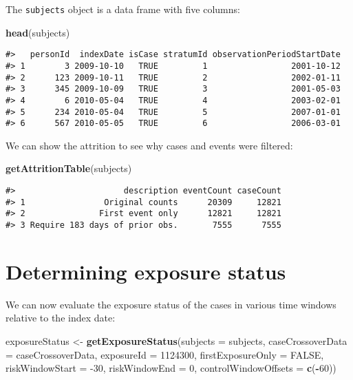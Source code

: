 \documentclass[]{article}
\newenvironment{Shaded}{\begin{snugshade}}{\end{snugshade}}
\newcommand{\DataTypeTok}[1]{\textcolor[rgb]{0.13,0.29,0.53}{#1}}
\newcommand{\DecValTok}[1]{\textcolor[rgb]{0.00,0.00,0.81}{#1}}
\newcommand{\KeywordTok}[1]{\textcolor[rgb]{0.13,0.29,0.53}{\textbf{#1}}}
\newcommand{\NormalTok}[1]{#1}
\newcommand{\OperatorTok}[1]{\textcolor[rgb]{0.81,0.36,0.00}{\textbf{#1}}}
\newcommand{\OtherTok}[1]{\textcolor[rgb]{0.56,0.35,0.01}{#1}}
\newcommand{\StringTok}[1]{\textcolor[rgb]{0.31,0.60,0.02}{#1}}
\begin{document}
The \texttt{subjects} object is a data frame with five columns:

\begin{Shaded}
\begin{Highlighting}[]
\KeywordTok{head}\NormalTok{(subjects)}
\end{Highlighting}
\end{Shaded}

\begin{verbatim}
#>   personId  indexDate isCase stratumId observationPeriodStartDate
#> 1        3 2009-10-10   TRUE         1                 2001-10-12
#> 2      123 2009-10-11   TRUE         2                 2002-01-11
#> 3      345 2009-10-09   TRUE         3                 2001-05-03
#> 4        6 2010-05-04   TRUE         4                 2003-02-01
#> 5      234 2010-05-04   TRUE         5                 2007-01-01
#> 6      567 2010-05-05   TRUE         6                 2006-03-01
\end{verbatim}

We can show the attrition to see why cases and events were filtered:

\begin{Shaded}
\begin{Highlighting}[]
\KeywordTok{getAttritionTable}\NormalTok{(subjects)}
\end{Highlighting}
\end{Shaded}

\begin{verbatim}
#>                      description eventCount caseCount
#> 1                Original counts      20309     12821
#> 2               First event only      12821     12821
#> 3 Require 183 days of prior obs.       7555      7555
\end{verbatim}

\hypertarget{determining-exposure-status}{%
\section{Determining exposure
status}\label{determining-exposure-status}}

We can now evaluate the exposure status of the cases in various time
windows relative to the index date:

\begin{Shaded}
\begin{Highlighting}[]
\NormalTok{exposureStatus <-}\StringTok{ }\KeywordTok{getExposureStatus}\NormalTok{(}\DataTypeTok{subjects =}\NormalTok{ subjects,}
                                    \DataTypeTok{caseCrossoverData =}\NormalTok{ caseCrossoverData,}
                                    \DataTypeTok{exposureId =} \DecValTok{1124300}\NormalTok{,}
                                    \DataTypeTok{firstExposureOnly =} \OtherTok{FALSE}\NormalTok{,}
                                    \DataTypeTok{riskWindowStart =} \DecValTok{-30}\NormalTok{,}
                                    \DataTypeTok{riskWindowEnd =} \DecValTok{0}\NormalTok{,}
                                    \DataTypeTok{controlWindowOffsets =} \KeywordTok{c}\NormalTok{(}\OperatorTok{-}\DecValTok{60}\NormalTok{))}
\end{Highlighting}
\end{Shaded}
\end{document}
